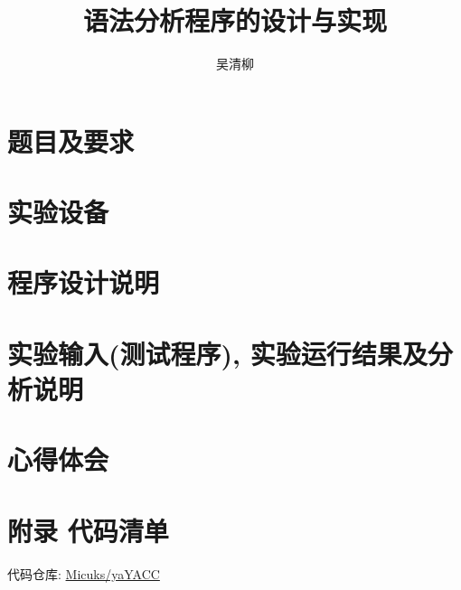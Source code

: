 \documentclass[12pt, twoside]{article}
\title{语法分析程序的设计与实现}
\author{\textup{吴清柳}}
\begin{document}

\tableofcontents
\newpage

\pagestyle{fancy}
\fancyhead{} %
\fancyfoot{} %
\fancyfoot[CE, CO]{\thepage}

\section{题目及要求}

\section{实验设备}

\section{程序设计说明}

\section{实验输入(测试程序), 实验运行结果及分析说明}

\section{心得体会}

\section{附录 代码清单}


代码仓库: \href{https://github.com/Micuks/yaYACC}{Micuks/yaYACC}

% 
% 
\end{document}
